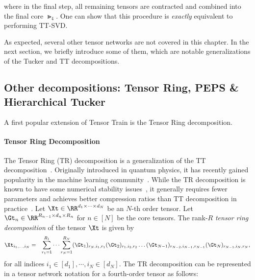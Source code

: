 where in the final step, all remaining tensors are contracted and combined into the final core $\Gt_4$. One can show that this procedure is \emph{exactly} equivalent to performing TT-SVD.

As expected, several other tensor networks are not covered in this chapter. In the next section, we briefly introduce some of them, which are notable generalizations of the Tucker and TT decompositions.
\subsection{Other decompositions: Tensor Ring, PEPS \& Hierarchical Tucker}

A first popular extension of Tensor Train is the Tensor Ring decomposition. 
\paragraph{Tensor Ring Decomposition}
The Tensor Ring (TR) decomposition is a generalization of the TT decomposition~\citep{zhao2016tensor}. Originally introduced in quantum physics, it has recently gained popularity in the machine learning community~\citep{wang2017efficient,wang2018wide,yuan2018higher}. While the TR decomposition is known to have some numerical stability issues~\citep{batselier2018trouble,chen2020tensor}, it generally requires fewer parameters and achieves better compression ratios than TT decomposition in practice~\citep{mickelin2020algorithms}. Let $\Xt\in\RR^{d_1\times\dots\times d_N}$
    be an $N$-th order tensor. Let 
    $\Gt_n\in\RR^{R_{n-1}\times d_n\times R_n}$ for $n\in[N]$ be the core tensors. 
    The rank-$R$ \emph{tensor ring decomposition} of the tensor $\Xt$ is given by
\begin{align*}
    \Xt_{i_1,\dots,i_N}=\hspace{0.25cm}\sum_{r_1=1}^{R_1}\dots\sum_{r_{N}=1}^{R_N}
    (\Gt_1)_{r_N,i_1,r_1} (\Gt_2)_{ r_1,i_2,r_2}\dots  (\Gt_{N-1})_{r_{N-2},i_{N-1},r_{N-1}} (\Gt_{N})_{r_{N-1},i_{N},r_N},
\end{align*}
for all indices $i_1\in[d_1],\cdots,i_N\in[d_N]$.
The TR decomposition can be represented in a tensor network notation for a fourth-order tensor as follows:
